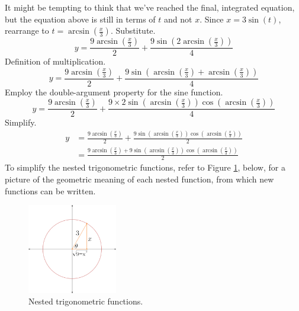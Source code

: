 \documentclass{article}
\begin{document}
It might be tempting to think that we've reached the final, integrated equation, but the equation above is still in terms of $t$ and not $x$. Since $x=3\sin(t)$, rearrange to $t=\arcsin\left(\frac{x}{3}\right)$. Substitute.
\begin{equation*}
    y=\frac{9\arcsin\left(\frac{x}{3}\right)}{2}+\frac{9\sin\left(2\arcsin\left(\frac{x}{3}\right)\right)}{4}
\end{equation*}
Definition of multiplication.
\begin{equation*}
    y=\frac{9\arcsin\left(\frac{x}{3}\right)}{2}+\frac{9\sin\left(\arcsin\left(\frac{x}{3}\right)+\arcsin\left(\frac{x}{3}\right)\right)}{4}
\end{equation*}
Employ the double-argument property for the sine function.
\begin{equation*}
    y=\frac{9\arcsin\left(\frac{x}{3}\right)}{2}+\frac{9 \times 2\sin\left(\arcsin\left(\frac{x}{3}\right)\right)\cos\left(\arcsin\left(\frac{x}{3}\right)\right)}{4}
\end{equation*}
Simplify.
\begin{align*}
    y &= \frac{9\arcsin\left(\frac{x}{3}\right)}{2}+\frac{9\sin\left(\arcsin\left(\frac{x}{3}\right)\right)\cos\left(\arcsin\left(\frac{x}{3}\right)\right)}{2}\\
    &= \frac{9\arcsin\left(\frac{x}{3}\right)+9\sin\left(\arcsin\left(\frac{x}{3}\right)\right)\cos\left(\arcsin\left(\frac{x}{3}\right)\right)}{2}
\end{align*}
To simplify the nested trigonometric functions, refer to Figure \ref{fig:1}, below, for a picture of the geometric meaning of each nested function, from which new functions can be written.

\begin{figure}
    \centering
    \includegraphics[width=0.35\textwidth]{Blender/Class1Var-NestedTrig-f_0001.png}
    \caption{\label{fig:1}Nested trigonometric functions.}
\end{figure}
\end{document}
